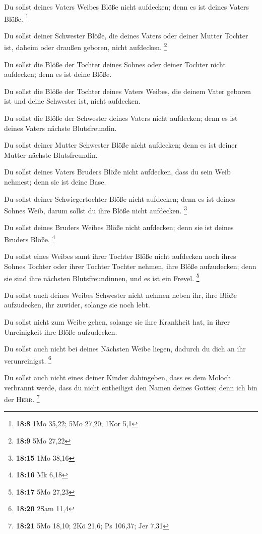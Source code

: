  Du sollst deines Vaters Weibes Blöße nicht aufdecken;
denn es ist deines Vaters Blöße. \footnote{\textbf{18:8} 1Mo 35,22; 5Mo
  27,20; 1Kor 5,1}

 Du sollst deiner Schwester Blöße, die deines Vaters oder
deiner Mutter Tochter ist, daheim oder draußen geboren, nicht aufdecken.
\footnote{\textbf{18:9} 5Mo 27,22}

 Du sollst die Blöße der Tochter deines Sohnes oder
deiner Tochter nicht aufdecken; denn es ist deine Blöße.

 Du sollst die Blöße der Tochter deines Vaters Weibes,
die deinem Vater geboren ist und deine Schwester ist, nicht aufdecken.

 Du sollst die Blöße der Schwester deines Vaters nicht
aufdecken; denn es ist deines Vaters nächste Blutsfreundin.

 Du sollst deiner Mutter Schwester Blöße nicht aufdecken;
denn es ist deiner Mutter nächste Blutsfreundin.

 Du sollst deines Vaters Bruders Blöße nicht aufdecken,
dass du sein Weib nehmest; denn sie ist deine Base.

 Du sollst deiner Schwiegertochter Blöße nicht aufdecken;
denn es ist deines Sohnes Weib, darum sollst du ihre Blöße nicht
aufdecken. \footnote{\textbf{18:15} 1Mo 38,16}

 Du sollst deines Bruders Weibes Blöße nicht aufdecken;
denn sie ist deines Bruders Blöße. \footnote{\textbf{18:16} Mk 6,18}

 Du sollst eines Weibes samt ihrer Tochter Blöße nicht
aufdecken noch ihres Sohnes Tochter oder ihrer Tochter Tochter nehmen,
ihre Blöße aufzudecken; denn sie sind ihre nächsten Blutsfreundinnen,
und es ist ein Frevel. \footnote{\textbf{18:17} 5Mo 27,23}

 Du sollst auch deines Weibes Schwester nicht nehmen
neben ihr, ihre Blöße aufzudecken, ihr zuwider, solange sie noch lebt.

 Du sollst nicht zum Weibe gehen, solange sie ihre
Krankheit hat, in ihrer Unreinigkeit ihre Blöße aufzudecken.

 Du sollst auch nicht bei deines Nächsten Weibe liegen,
dadurch du dich an ihr verunreinigst. \footnote{\textbf{18:20} 2Sam 11,4}

 Du sollst auch nicht eines deiner Kinder dahingeben,
dass es dem Moloch verbrannt werde, dass du nicht entheiligst den Namen
deines Gottes; denn ich bin der \textsc{Herr}. \footnote{\textbf{18:21}
  5Mo 18,10; 2Kö 21,6; Ps 106,37; Jer 7,31}

